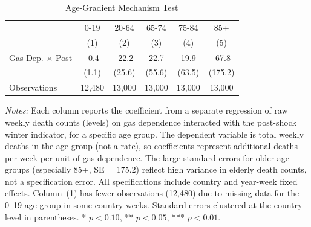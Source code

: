 \begin{table}[!htbp]
\centering
\caption{Age-Gradient Mechanism Test}
\label{tab:age_gradient}
\begin{tabular}{lccccc}
\hline\hline
 & 0-19 & 20-64 & 65-74 & 75-84 & 85+ \\
 & (1) & (2) & (3) & (4) & (5) \\
\hline
\addlinespace
Gas Dep. $\times$ Post & -0.4 & -22.2 & 22.7 & 19.9 & -67.8 \\
 & (1.1) & (25.6) & (55.6) & (63.5) & (175.2) \\
\addlinespace
Observations & 12,480 & 13,000 & 13,000 & 13,000 & 13,000 \\
\hline\hline
\end{tabular}
\begin{tablenotes}[flushleft]
\small
\item \textit{Notes:} Each column reports the coefficient from a separate regression of raw weekly death counts (levels) on gas dependence interacted with the post-shock winter indicator, for a specific age group. The dependent variable is total weekly deaths in the age group (not a rate), so coefficients represent additional deaths per week per unit of gas dependence. The large standard errors for older age groups (especially 85+, SE = 175.2) reflect high variance in elderly death counts, not a specification error. All specifications include country and year-week fixed effects. Column~(1) has fewer observations (12,480) due to missing data for the 0--19 age group in some country-weeks. Standard errors clustered at the country level in parentheses. * $p<0.10$, ** $p<0.05$, *** $p<0.01$.
\end{tablenotes}
\end{table}


